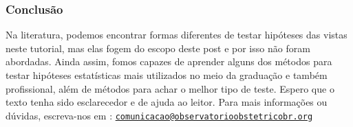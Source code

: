 \documentclass[
]{article}
\begin{document}
\hypertarget{conclusuxe3o}{%
\subsubsection{Conclusão}\label{conclusuxe3o}}

Na literatura, podemos encontrar formas diferentes de testar hipóteses
das vistas neste tutorial, mas elas fogem do escopo deste post e por
isso não foram abordadas. Ainda assim, fomos capazes de aprender alguns
dos métodos para testar hipóteses estatísticas mais utilizados no meio
da graduação e também profissional, além de métodos para achar o melhor
tipo de teste. Espero que o texto tenha sido esclarecedor e de ajuda ao
leitor. Para mais informações ou dúvidas, escreva-nos em :
\href{mailto:comunicacao@observatorioobstetricobr.org}{\nolinkurl{comunicacao@observatorioobstetricobr.org}}
\end{document}
